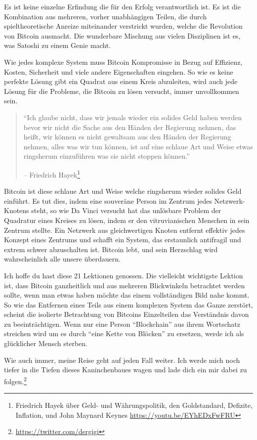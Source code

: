 Es ist keine einzelne Erfindung die für den Erfolg verantwortlich ist. Es ist
die Kombination aus mehreren, vorher unabhängigen Teilen, die durch
spieltheoretische Anreize miteinander verstrickt wurden, welche die Revolution
von Bitcoin ausmacht. Die wunderbare Mischung aus vielen Disziplinen ist es, was
Satoshi zu einem Genie macht.

Wie jedes komplexe System muss Bitcoin Kompromisse in Bezug auf
Effizienz, Kosten, Sicherheit und viele andere Eigenschaften eingehen. So wie es
keine perfekte Lösung gibt ein Quadrat aus einem Kreis abzuleiten, wird auch
jede Lösung für die Probleme, die Bitcoin zu lösen versucht, immer unvollkommen
sein.

\begin{quotation}\begin{samepage}
\enquote{Ich glaube nicht, dass wir jemals wieder ein solides Geld haben werden
bevor wir nicht die Sache aus den Händen der Regierung nehmen, das heißt, wir
können es nicht gewaltsam aus den Händen der Regierung nehmen, alles was wir tun
können, ist auf eine schlaue Art und Weise etwas ringsherum einzuführen was sie
nicht stoppen können.}
\begin{flushright} -- Friedrich Hayek\footnote{Friedrich Hayek über Geld- und
Währungspolitik, den Goldstandard, Defizite, Inflation, und John Maynard Keynes
\url{https://youtu.be/EYhEDxFwFRU}}
\end{flushright}\end{samepage}\end{quotation}

Bitcoin ist diese schlaue Art und Weise welche ringsherum wieder solides Geld
einführt. Es tut dies, indem eine souveräne Person im Zentrum jedes Netzwerk-Knotens steht,
so wie Da Vinci versucht hat das unlösbare Problem der Quadratur eines Kreises
zu lösen, indem er den vitruvianischen Menschen in sein Zentrum stellte. Ein
Netzwerk aus gleichwertigen Knoten entfernt effektiv jedes Konzept eines Zentrums
und schafft ein System, das erstaunlich antifragil und extrem schwer abzuschalten
ist. Bitcoin lebt, und sein Herzschlag wird wahrscheinlich alle unsere
überdauern.

Ich hoffe du hast diese 21 Lektionen genossen. Die vielleicht wichtigste Lektion
ist, dass Bitcoin ganzheitlich und aus mehreren Blickwinkeln betrachtet werden
sollte, wenn man etwas haben möchte das einem vollständigen Bild nahe kommt. So
wie das Entfernen eines Teils aus einem komplexen System das Ganze zerstört,
scheint die isolierte Betrachtung von Bitcoins Einzelteilen das Verständnis
davon zu beeinträchtigen. Wenn nur eine Person \enquote{Blockchain} aus ihrem
Wortschatz streichen wird um es durch \enquote{eine Kette von Blöcken} zu
ersetzen, werde ich als glücklicher Mensch sterben.

Wie auch immer, meine Reise geht auf jeden Fall weiter. Ich werde mich noch
tiefer in die Tiefen dieses Kaninchenbaues wagen und lade dich ein mir dabei zu
folgen.\footnote{\url{https://twitter.com/dergigi}}

%

